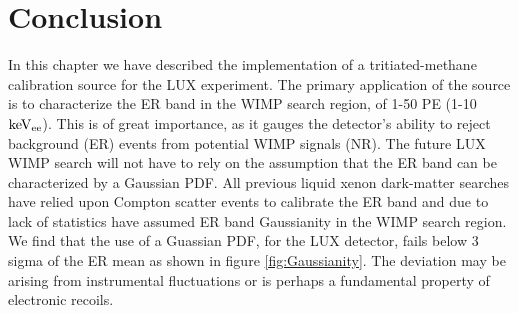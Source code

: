 \section{Conclusion}

In this chapter we have described the implementation of a tritiated-methane calibration source for the LUX experiment. The primary application of the source is to characterize the ER band in the WIMP search region, of 1-50 PE (1-10 $\rm keV_{ee}$). This is of great importance, as it gauges the detector's ability to reject background (ER) events from potential WIMP signals (NR). The future LUX WIMP search will not have to rely on the assumption that the ER band can be characterized by a Gaussian PDF.  All previous liquid xenon dark-matter searches have relied upon Compton scatter events to calibrate the ER band and due to lack of statistics have assumed ER band Gaussianity in the WIMP search region. We find that the use of a Guassian PDF, for the LUX detector, fails below 3 sigma of the ER mean as shown in figure \ref{fig:Gaussianity}. The deviation may be arising from instrumental fluctuations or is perhaps a fundamental property of electronic recoils. 

